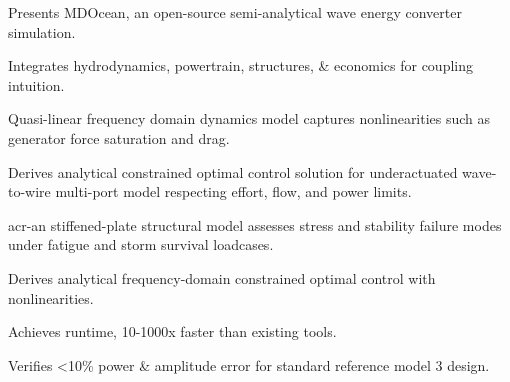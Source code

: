 \item Presents MDOcean, an open-source semi-analytical wave energy converter simulation.
\item Integrates hydrodynamics, powertrain, structures, \& economics for coupling intuition.

\ifdefined\DISSERTATION
    \item Quasi-linear frequency domain dynamics model captures nonlinearities such as generator force saturation and drag.
    \item Derives analytical constrained optimal control solution for underactuated wave-to-wire multi-port model respecting effort, flow, and power limits.
    \item \gls{acr-an} stiffened-plate structural model assesses stress and stability failure modes under fatigue and storm survival loadcases.
\else
    \item Derives analytical frequency-domain constrained optimal control with nonlinearities.
\fi

\item Achieves \resultsAOR[simRuntime] runtime, 10-1000x faster than existing tools.
\item Verifies <10\% power \& amplitude error for standard reference model 3 design.
